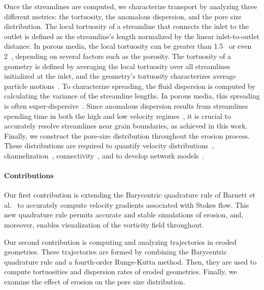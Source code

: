\documentclass{jfm}
\begin{document}
Once the streamlines are computed, we characterize transport by
analyzing three different metrics: the tortuosity, the anomalous
dispersion, and the pore size distribution.  The local tortuosity of a
streamline that connects the inlet to the outlet is defined as the
streamline's length normalized by the linear inlet-to-outlet distance.
In porous media, the local tortuosity can be greater than
1.5~\citep{kop-kat-tim1996, mat-kha-koz2008} or even
2~\citep{dud-koz-mat2011}, depending on several factors such as the
porosity. The tortuosity of a geometry is defined by averaging the local
tortuosity over all streamlines initialized at the inlet, and the
geometry's tortuosity characterizes average particle
motions~\citep{hak-com-den2019}.  To characterize spreading, the fluid
dispersion is computed by calculating the variance of the streamline
lengths. In porous media, this spreading is often
super-dispersive~\citep{kan-dea-nun-bij-blu-jua2014, cus-hu-den1995,
dea-leb-den-tar-bol-dav2013}. Since anomalous dispersion results from
streamlines spending time in both the high and low velocity
regimes~\citep{ber-sch2001}, it is crucial to accurately resolve
streamlines near grain boundaries, as achieved in this work.  Finally,
we construct the pore-size distribution throughout the erosion process.
These distributions are required to quantify velocity
distributions~\citep{ali-par-wei-bre2017, dea-qua-bir-jua2018},
channelization~\citep{sie-ili-pri-riv-gua2019},
connectivity~\citep{knu-car2005, wes-blo-gra2001}, and to develop network
models~\citep{bry-kin-mel1993, bry-mel-cad1993, bij-blu2006}. 

\paragraph{Contributions}
Our first contribution is extending the Barycentric quadrature rule of
Barnett et al.~\citep{bar-wu-vee2015} to accurately compute velocity
gradients associated with Stokes flow. This new quadrature rule permits
accurate and stable simulations of erosion, and, moreover, enables
visualization of the vorticity field throughout.

Our second contribution is computing and analyzing trajectories in
eroded geometries.  These trajectories are formed by combining the
Barycentric quadrature rule and a fourth-order Runge-Kutta method. Then,
they are used to compute tortuosities and dispersion rates of eroded
geometries. Finally, we examine the effect of erosion on the pore size
distribution.
\end{document}
